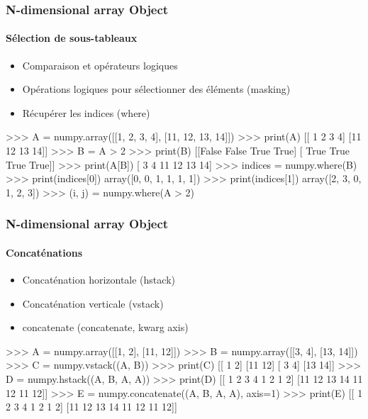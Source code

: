 \begin{frame}[fragile]
\frametitle{N-dimensional array Object}
\framesubtitle{Sélection de sous-tableaux}
\begin{itemize}
 \item Comparaison et opérateurs logiques
 \item Opérations logiques pour sélectionner des éléments (masking)
 \item Récupérer les indices (where)
\end{itemize}
\begin{pythonConsole}
>>> A = numpy.array([[1, 2, 3, 4], [11, 12, 13, 14]])
>>> print(A)
[[ 1  2  3  4]
 [11 12 13 14]]
>>> B = A > 2
>>> print(B)
[[False False  True  True]
 [ True  True  True  True]]
>>> print(A[B])
[ 3  4 11 12 13 14]
>>> indices = numpy.where(B)
>>> print(indices[0])
array([0, 0, 1, 1, 1, 1])
>>> print(indices[1])
array([2, 3, 0, 1, 2, 3])
>>> (i, j) = numpy.where(A > 2)
\end{pythonConsole}
\end{frame}
\begin{frame}[fragile]
\frametitle{N-dimensional array Object}
\framesubtitle{Concaténations}
\begin{itemize}
 \item Concaténation horizontale (hstack)
 \item Concaténation verticale (vstack)
 \item concatenate (concatenate, kwarg axis)
\end{itemize}
\begin{pythonConsole}
>>> A = numpy.array([[1, 2], [11, 12]])
>>> B = numpy.array([[3, 4], [13, 14]])
>>> C = numpy.vstack((A, B))
>>> print(C)
[[ 1  2]
 [11 12]
 [ 3  4]
 [13 14]]
>>> D = numpy.hstack((A, B, A, A))
>>> print(D)
[[ 1  2  3  4  1  2  1  2]
 [11 12 13 14 11 12 11 12]]
>>> E = numpy.concatenate((A, B, A, A), axis=1)
>>> print(E)
[[ 1  2  3  4  1  2  1  2]
 [11 12 13 14 11 12 11 12]]
\end{pythonConsole}
\end{frame}
